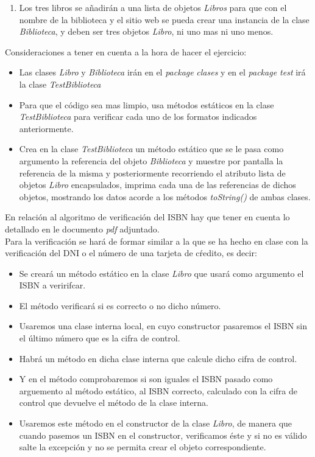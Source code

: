 \documentclass[addpoints,12pt]{exam}
\begin{document}
\begin{questions}
\begin{description}
\begin{itemize}
\begin{enumerate}
\item Los tres libros se añadirán a una lista de objetos \emph{Libros} para que con el nombre de la biblioteca y el sitio web se pueda crear una instancia de la clase \emph{Biblioteca}, y deben ser tres objetos \emph{Libro}, ni uno mas ni uno menos.
\end{enumerate}
\end{itemize}
\end{description}
Consideraciones a tener en cuenta a la hora de hacer el ejercicio:
\begin{itemize}
\item Las clases \emph{Libro} y \emph{Biblioteca} irán en el \emph{package} \emph{clases} y en el \emph{package test} irá la clase \emph{TestBiblioteca}
\item Para que el código sea mas limpio, usa métodos estáticos en la clase \emph{TestBiblioteca} para verificar cada uno de los formatos indicados anteriormente.
\item Crea en la clase \emph{TestBiblioteca} un método estático que se le pasa como argumento la referencia del objeto \emph{Biblioteca} y muestre por pantalla la referencia de la misma y posteriormente recorriendo el atributo lista de objetos \emph{Libro} encapsulados, imprima cada una de las referencias de dichos objetos, mostrando los datos acorde a los métodos \emph{toString()} de ambas clases.
\end{itemize}
En relación al algoritmo de verificación del ISBN hay que tener en cuenta lo detallado en le documento \emph{pdf} adjuntado.\\
Para la verificación se hará de formar similar a la que se ha hecho en clase con la verificación del DNI o el número de una tarjeta de cŕedito, es decir:
\begin{itemize}
\item Se creará un método estático en la clase \emph{Libro} que usará como argumento el ISBN a veririfcar.
\item El método verificará si es correcto o no dicho número.
\item Usaremos una clase interna local, en cuyo constructor pasaremos el ISBN sin el último número que es la cifra de control.
\item Habrá un método en dicha clase interna que calcule dicho cifra de control.
\item Y en el método comprobaremos si son iguales el ISBN pasado como arguemento al método estático, al ISBN correcto, calculado con la cifra de control que devuelve el método de la clase interna.
\item Usaremos este método en el constructor de la clase \emph{Libro}, de manera que cuando pasemos un ISBN en el constructor, verificamos éste y si no es válido salte la excepción y no se permita crear el objeto correspondiente.
\end{itemize}


\end{questions}
\end{document}
